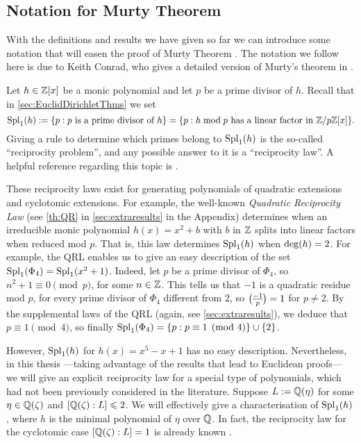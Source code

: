 \documentclass[../main.tex]{subfiles}
\begin{document}
\subsection{Notation for Murty Theorem}\label{sec:notationMurty}

With the definitions and results we have given so far we can introduce some notation that will easen the proof of Murty Theorem \cite{Murty}. The notation we follow here is due to Keith Conrad, who gives a detailed version of Murty's theorem in \cite{Conrad}. 

Let $h\in\mathbb{Z}[x]$ be a monic polynomial and let $p$ be a prime divisor of $h$. Recall that in \cref{sec:EuclidDirichletThms} we set
	\begin{equation*}
		\operatorname{Spl}_1(h):=\{p : \text{$p$ is a prime divisor of $h$}\}=\{p : \text{$h \bmod{p}$ has a linear factor in $\mathbb{Z}/p\mathbb{Z}[x]$}\}.
	\end{equation*}
Giving a rule to determine which primes belong to $\operatorname{Spl}_1(h)$ is the so-called ``reciprocity problem'', and any possible answer to it is a ``reciprocity law''. A helpful reference regarding this topic is \cite{Chebotarev2}.

These reciprocity laws exist for generating polynomials of quadratic extensions and cyclotomic extensions. For example, the well-known \emph{Quadratic Reciprocity Law} (see \cref{th:QR} in \cref{sec:extraresults} in the Appendix) determines when an irreducible monic polynomial $h(x)=x^2+b$ with $b$ in $\mathbb{Z}$ splits into linear factors when reduced mod $p$. That is, this law determines $\operatorname{Spl}_1(h)$ when $\operatorname{deg}(h)=2$. For example, the QRL enables us to give an easy description of the set $\operatorname{Spl}_1(\Phi_4)=\operatorname{Spl}_1(x^2+1)$. Indeed, let $p$ be a prime divisor of $\Phi_4$, so $n^2+1\equiv 0\pmod{p}$, for some $n\in\mathbb{Z}$. This tells us that $-1$ is a quadratic residue mod $p$, for every prime divisor of $\Phi_4$ different from $2$, so $\legendre{-1}{p}=1$ for $p\neq 2$. By the supplemental laws of the QRL (again, see \cref{sec:extraresults}), we deduce that $p\equiv 1\pmod{4}$, so finally $\operatorname{Spl}_1(\Phi_4)=\{p: p\equiv 1\pmod{4}\}\cup\{2\}$.

 However, $\operatorname{Spl}_1(h)$ for $h(x)=x^5-x+1$ has no easy description. Nevertheless, in this thesis ---taking advantage of the results that lead to Euclidean proofs--- we will give an explicit reciprocity law for a special type of polynomials, which had not been previously considered in the literature. Suppose $L:=\mathbb{Q}(\eta)$ for some $\eta\in\mathbb{Q}(\zeta)$ and $[\mathbb{Q}(\zeta):L]\leqslant 2$. We will effectively give a characterisation of $\operatorname{Spl}_1(h)$, where $h$ is the minimal polynomial of $\eta$ over $\mathbb{Q}$. In fact, the reciprocity law for the cyclotomic case $[\mathbb{Q}(\zeta):L]=1$ is already known \cite{Chebotarev2}.
 
\end{document}
